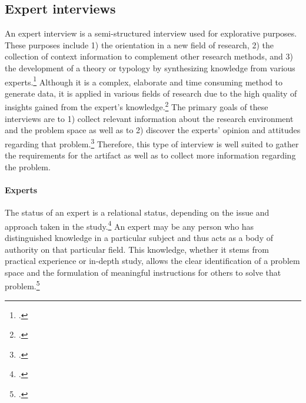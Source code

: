 \subsection{Expert interviews} \label{subsec:ExpertInterviews}
An expert interview is a semi-structured interview used for explorative purposes. These purposes include 1) the orientation in a new field of research, 2) the collection of context information to complement other research methods, and 3) the development of a theory or typology by synthesizing knowledge from various experts.\footcites[Cf.][p.450]{PfadenhauerExperteninterviewGesprachauf2007}[cf.][p.172]{HickeyElicitationtechniqueselection2003} Although it is a complex, elaborate and time consuming method to generate data, it is applied in various fields of research due to the high quality of insights gained from the expert's knowledge.\footcites[Cf.][p.459]{PfadenhauerExperteninterviewGesprachauf2007}[cf.][p.442]{MeuserExpertInneninterviewsvielfacherprobt1991}[cf.][p.424]{BuberQualitativeMarktforschungKonzepte2007}[cf.][p.179]{Flickintroductionqualitativeresearch2009}[cf.][p.465]{MeuserExperteninterviewkonzeptionelleGrundlagen2009}[cf.][p.31]{BognerInterviewsmitExperten2014}
The primary goals of these interviews are to 1) collect relevant information about the research environment and the problem space as well as to 2) discover the experts' opinion and attitudes regarding that problem.\footcite[Cf.][p.28 et seq]{BognerInterviewsmitExperten2014} Therefore, this type of interview is well suited to gather the requirements for the artifact as well as to collect more information regarding the problem.

\paragraph{Experts} The status of an expert is a relational status, depending on the issue and approach taken in the study.\footcites[Cf.][p.179]{Flickintroductionqualitativeresearch2009}[cf.][p.444]{MeuserExpertInneninterviewsvielfacherprobt1991} An expert may be any person who has distinguished knowledge in a particular subject and thus acts as a body of authority on that particular field. This knowledge, whether it stems from practical experience or in-depth study, allows the clear identification of a problem space and the formulation of meaningful instructions for others to solve that problem.\footcites[Cf.][p.469]{MeuserExpertInneninterviewsvielfacherprobt1991}[cf.][p.467]{MeuserExperteninterviewkonzeptionelleGrundlagen2009}[cf.][p.179]{Flickintroductionqualitativeresearch2009}[cf.][p.451]{PfadenhauerExperteninterviewGesprachauf2007}[cf.][p.19]{BognerInterviewsmitExperten2014}

